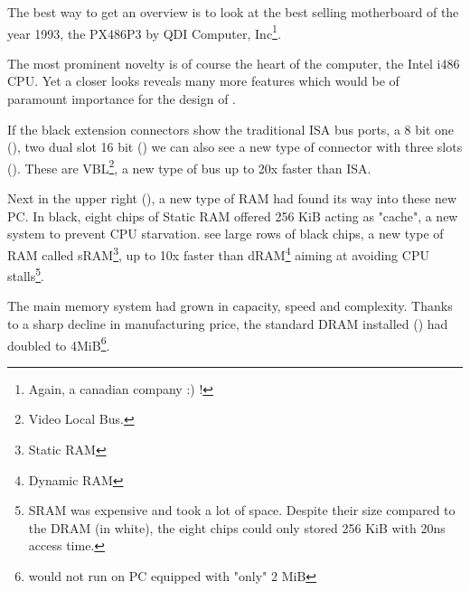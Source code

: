 
\cleartoleftpage
 The best way to get an overview is to look at the best selling motherboard of the year 1993, the PX486P3 by QDI Computer, Inc\footnote{Again, a canadian company :) !}.\\
\par

\par
The most prominent novelty is of course the heart of the computer, the Intel i486 CPU. Yet a closer looks reveals many more features which would be of paramount importance for the design of \doom.\\
\par 
If the black extension connectors show the traditional ISA bus ports, a 8 bit one (), two dual slot 16 bit () we can also see a new type of connector with three slots (). These are VBL\footnote{Video Local Bus.}, a new type of bus up to 20x faster than ISA.\\
\par
 Next in the upper right (), a new type of RAM had found its way into these new PC. In black, eight chips of Static RAM offered 256 KiB acting as "cache", a new system to prevent CPU starvation. see large rows of black chips, a new type of RAM called sRAM\footnote{Static RAM}, up to 10x faster than dRAM\footnote{Dynamic RAM} aiming at avoiding CPU stalls\footnote{SRAM was expensive and took a lot of space. Despite their size compared to the DRAM (in white), the eight chips could only stored 256 KiB with 20ns access time.}. \\
\par
{}
\par
The main memory system had grown in capacity, speed and complexity. Thanks to a sharp decline in manufacturing price, the standard DRAM installed () had doubled to 4MiB\footnote{\doom would not run on PC equipped with "only" 2 MiB}.\\
\par

